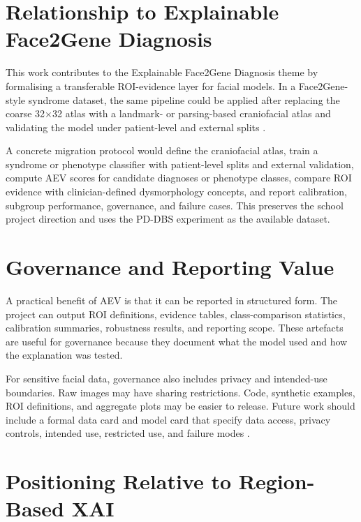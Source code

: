 \section{Relationship to Explainable Face2Gene Diagnosis}

This work contributes to the Explainable Face2Gene Diagnosis theme by formalising a transferable ROI-evidence layer for facial models. In a Face2Gene-style syndrome dataset, the same pipeline could be applied after replacing the coarse 32$\times$32 atlas with a landmark- or parsing-based craniofacial atlas and validating the model under patient-level and external splits   .


A concrete migration protocol would define the craniofacial atlas, train a syndrome or phenotype classifier with patient-level splits and external validation, compute AEV scores for candidate diagnoses or phenotype classes, compare ROI evidence with clinician-defined dysmorphology concepts, and report calibration, subgroup performance, governance, and failure cases. This preserves the school project direction and uses the PD-DBS experiment as the available dataset.


\section{Governance and Reporting Value}

A practical benefit of AEV is that it can be reported in structured form. The project can output ROI definitions, evidence tables, class-comparison statistics, calibration summaries, robustness results, and reporting scope. These artefacts are useful for governance because they document what the model used and how the explanation was tested.


For sensitive facial data, governance also includes privacy and intended-use boundaries. Raw images may have sharing restrictions. Code, synthetic examples, ROI definitions, and aggregate plots may be easier to release. Future work should include a formal data card and model card that specify data access, privacy controls, intended use, restricted use, and failure modes  .


\section{Positioning Relative to Region-Based XAI}

